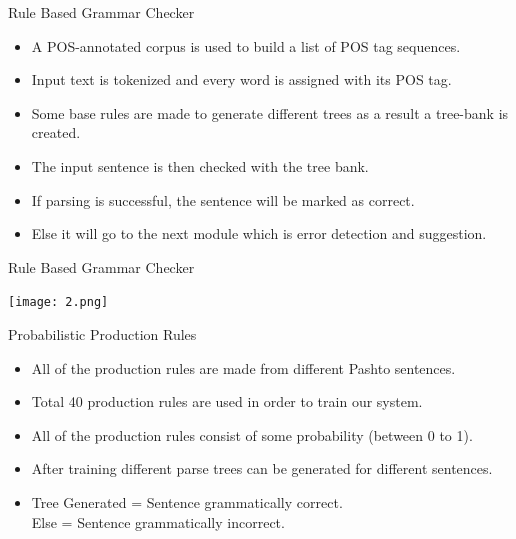 \documentclass{beamer}
\begin{document}
\begin{frame}{Rule Based Grammar Checker}
	\begin{itemize}
	\item  A POS-annotated corpus is used to build a list of POS tag sequences. \\
	\vspace{1em}
	\item  Input text is tokenized and every word is assigned with its POS tag. \\
	\vspace{1em}
	\item  Some base rules are made to generate different trees as a result a tree-bank is created.  \\
	\vspace{1em} 
	\item  The input sentence is then checked with the tree bank. \\
	\vspace{1em}
	\item  If parsing is successful, the sentence will be marked as correct. \\
	\vspace{1em}
	\item  Else it will go to the next module which is error detection and suggestion.
	\end{itemize}
\end{frame}


\begin{frame}{Rule Based Grammar Checker}
\begin{center}
	\texttt{[image: 2.png]}	
\end{center}
\end{frame}




\begin{frame}{Probabilistic Production Rules}
	\begin{itemize}
	\item  All of the production rules are made from different Pashto sentences. \\
	\vspace{1em}
	\item  Total 40 production rules are used in order to train our system. \\
	\vspace{1em}
	\item  All of the production rules consist of some probability (between 0 to 1).  \\
	\vspace{1em} 
	\item  After training different parse trees can be generated for different sentences. \\
	\vspace{1em}
	\item  Tree Generated = Sentence grammatically correct.\\
		Else = Sentence grammatically incorrect. \\
	\vspace{1em}
	\end{itemize}
\end{frame}
\end{document}
